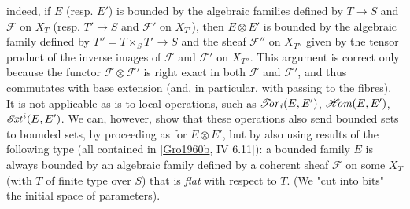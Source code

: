   indeed, if \(E\) (resp. \(E'\)) is bounded by the algebraic families defined by \(T\to  S\) and \(\mathscr {F}\) on \(X_T\) (resp. \(T'\to  S\) and \(\mathscr {F}'\) on \(X_{T'}\)), then \(E\otimes  E'\) is bounded by the algebraic family defined by \(T''=T\times _S T'\to  S\) and the sheaf \(\mathscr {F}''\) on \(X_{T''}\) given by the tensor product of the inverse images of \(\mathscr {F}\) and \(\mathscr {F}'\) on \(X_{T''}\).
  This argument is correct only because the functor \(\mathscr {F}\otimes \mathscr {F}'\) is right exact in both \(\mathscr {F}\) and \(\mathscr {F}'\), and thus commutates with base extension (and, in particular, with passing to the fibres).
  It is not applicable as-is to local operations, such as \(\mathscr {T}\kern  -2.75pt\mathit {or}_i(E,E')\), \(\mathscr {H}\kern  -2.5pt\mathit {om}(E,E')\), \(\mathscr {E}\kern  -1.5pt\mathit {xt}^i(E,E')\).
  We can, however, show that these operations also send bounded sets to bounded sets, by proceeding as for \(E\otimes  E'\), but by also using results of the following type (all contained in [\hyperref[Gro1960b]{Gro1960b}, IV 6.11]):
  a bounded family \(E\) is always bounded by an algebraic family defined by a coherent sheaf \(\mathscr {F}\) on some \(X_T\) (with \(T\) of finite type over \(S\)) that is \emph{flat} with respect to \(T\).
  (We "cut into bits" the initial space of parameters).
  
